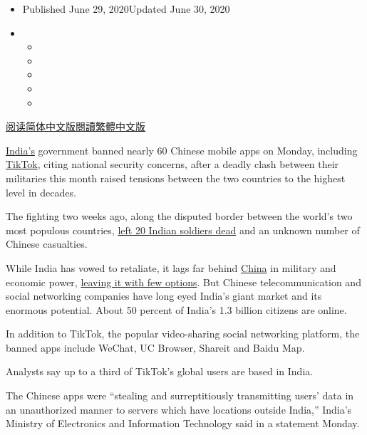 \begin{itemize}
\item
  Published June 29, 2020Updated June 30, 2020
\item
  \begin{itemize}
  \item
  \item
  \item
  \item
  \item
  \end{itemize}
\end{itemize}

\href{https://cn.nytimes.com/world/20200630/tik-tok-banned-india-china/}{阅读简体中文版}\href{https://cn.nytimes.com/world/20200630/tik-tok-banned-india-china/zh-hant/}{閱讀繁體中文版}

\href{https://www.nytimes.com/2020/06/30/technology/india-china-tiktok.html}{India's}
government banned nearly 60 Chinese mobile apps on Monday, including
\href{https://www.nytimes.com/2020/06/30/technology/india-china-tiktok.html}{TikTok},
citing national security concerns, after a deadly clash between their
militaries this month raised tensions between the two countries to the
highest level in decades.

The fighting two weeks ago, along the disputed border between the
world's two most populous countries,
\href{https://www.nytimes.com/2020/06/16/world/asia/indian-china-border-clash.html}{left
20 Indian soldiers dead} and an unknown number of Chinese casualties.

While India has vowed to retaliate, it lags far behind
\href{https://www.nytimes.com/2020/06/30/technology/india-china-tiktok.html}{China}
in military and economic power,
\href{https://www.nytimes.com/2020/06/19/world/asia/india-china-border.html}{leaving
it with few options}. But Chinese telecommunication and social
networking companies have long eyed India's giant market and its
enormous potential. About 50 percent of India's 1.3 billion citizens are
online.

In addition to TikTok, the popular video-sharing social networking
platform, the banned apps include WeChat, UC Browser, Shareit and Baidu
Map.

Analysts say up to a third of TikTok's global users are based in India.

The Chinese apps were ``stealing and surreptitiously transmitting users'
data in an unauthorized manner to servers which have locations outside
India,'' India's Ministry of Electronics and Information Technology said
in a statement Monday.


